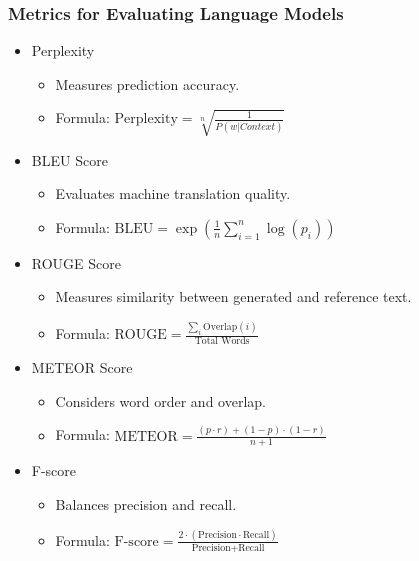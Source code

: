 \documentclass{beamer}
\begin{document}
\begin{frame}
\frametitle{Metrics for Evaluating Language Models}
\begin{itemize}
  \item Perplexity
    \begin{itemize}
      \item Measures prediction accuracy.
      \item Formula: $\text{Perplexity} = \sqrt[n]{\frac{1}{P(w|Context)}}$
    \end{itemize}
  \item BLEU Score
    \begin{itemize}
      \item Evaluates machine translation quality.
      \item Formula: $\text{BLEU} = \exp\left(\frac{1}{n}\sum_{i=1}^{n} \log(p_i)\right)$
    \end{itemize}
  \item ROUGE Score
    \begin{itemize}
      \item Measures similarity between generated and reference text.
      \item Formula: $\text{ROUGE} = \frac{\sum_{i} \text{Overlap}(i)}{\text{Total Words}}$
    \end{itemize}
  \item METEOR Score
    \begin{itemize}
      \item Considers word order and overlap.
      \item Formula: $\text{METEOR} = \frac{(p \cdot r) + (1 - p) \cdot (1 - r)}{n + 1}$
    \end{itemize}
  \item F-score
    \begin{itemize}
      \item Balances precision and recall.
      \item Formula: $\text{F-score} = \frac{2 \cdot (\text{Precision} \cdot \text{Recall})}{\text{Precision} + \text{Recall}}$
    \end{itemize}
\end{itemize}
\end{frame}
\end{document}
